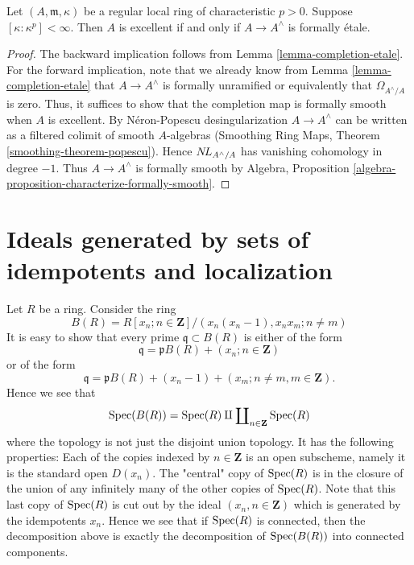 \begin{lemma}
\label{lemma-excellent-regular-local-rings}
Let $(A, \mathfrak m, \kappa)$ be a regular local ring of characteristic
$p > 0$. Suppose $[\kappa : \kappa^p] < \infty$. Then $A$ is excellent
if and only if $A \to A^\wedge$ is formally \'etale.
\end{lemma}

\begin{proof}
The backward implication follows from Lemma \ref{lemma-completion-etale}.
For the forward implication, note that we already know from
Lemma \ref{lemma-completion-etale}
that $A \to A^\wedge$ is formally unramified or equivalently
that $\Omega_{A^\wedge/A}$ is zero.
Thus, it suffices to show that the completion map is formally smooth when
$A$ is excellent. By N\'eron-Popescu
desingularization $A \to A^\wedge$ can be  written as a filtered
colimit of smooth $A$-algebras
(Smoothing Ring Maps, Theorem \ref{smoothing-theorem-popescu}).
Hence $\mathop{N\!L}\nolimits_{A^\wedge/A}$ has vanishing cohomology in degree $-1$.
Thus $A \to A^\wedge$ is formally smooth by Algebra, Proposition
\ref{algebra-proposition-characterize-formally-smooth}.
\end{proof}










\section{Ideals generated by sets of idempotents and localization}
\label{section-ideal-locally-idempotents}

\noindent
Let $R$ be a ring. Consider the ring
$$
B(R) = R[x_n; n \in \mathbf{Z}]/(x_n(x_n - 1), x_nx_m; n \not = m)
$$
It is easy to show that every prime $\mathfrak q \subset B(R)$
is either of the form
$$
\mathfrak q = \mathfrak pB(R) + (x_n; n \in \mathbf{Z})
$$
or of the form
$$
\mathfrak q =
\mathfrak pB(R) + (x_n - 1) + (x_m; n \not = m, m \in \mathbf{Z}).
$$
Hence we see that
$$
\mathop{\mathrm{Spec}}(B(R)) =
\mathop{\mathrm{Spec}}(R) \amalg \coprod\nolimits_{n \in \mathbf{Z}} \mathop{\mathrm{Spec}}(R)
$$
where the topology is not just the disjoint union topology. It has the
following properties: Each of the copies indexed by $n \in \mathbf{Z}$
is an open subscheme, namely it is the standard open $D(x_n)$.
The "central" copy of $\mathop{\mathrm{Spec}}(R)$ is in the closure of the union
of any infinitely many of the other copies of $\mathop{\mathrm{Spec}}(R)$.
Note that this last copy of $\mathop{\mathrm{Spec}}(R)$ is cut out by the ideal
$(x_n, n \in \mathbf{Z})$ which is generated by the idempotents $x_n$.
Hence we see that if $\mathop{\mathrm{Spec}}(R)$ is connected,
then the decomposition above is exactly the decomposition of
$\mathop{\mathrm{Spec}}(B(R))$ into connected components.

